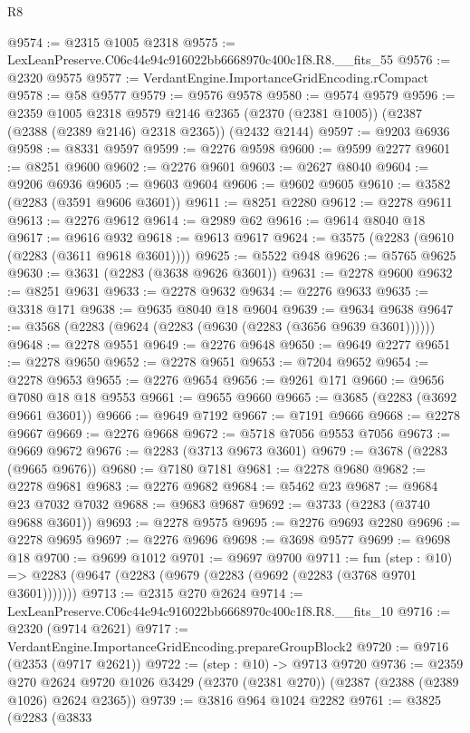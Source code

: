 \begin{lexlean}{R8}
\begin{coremodule}
@9574 := @2315 @1005 @2318
@9575 := LexLeanPreserve.C06c44e94c916022bb6668970c400c1f8.R8.__fits_55
@9576 := @2320 @9575
@9577 := VerdantEngine.ImportanceGridEncoding.rCompact
@9578 := @58 @9577
@9579 := @9576 @9578
@9580 := @9574 @9579
@9596 := @2359
    @1005
    @2318
    @9579
    @2146
    @2365
    (@2370 (@2381 @1005))
    (@2387 (@2388 (@2389 @2146) @2318 @2365))
    (@2432 @2144)
@9597 := @9203 @6936
@9598 := @8331 @9597
@9599 := @2276 @9598
@9600 := @9599 @2277
@9601 := @8251 @9600
@9602 := @2276 @9601
@9603 := @2627 @8040
@9604 := @9206 @6936
@9605 := @9603 @9604
@9606 := @9602 @9605
@9610 := @3582 (@2283 (@3591 @9606 @3601))
@9611 := @8251 @2280
@9612 := @2278 @9611
@9613 := @2276 @9612
@9614 := @2989 @62
@9616 := @9614 @8040 @18
@9617 := @9616 @932
@9618 := @9613 @9617
@9624 := @3575 (@2283 (@9610 (@2283 (@3611 @9618 @3601))))
@9625 := @5522 @948
@9626 := @5765 @9625
@9630 := @3631 (@2283 (@3638 @9626 @3601))
@9631 := @2278 @9600
@9632 := @8251 @9631
@9633 := @2278 @9632
@9634 := @2276 @9633
@9635 := @3318 @171
@9638 := @9635 @8040 @18 @9604
@9639 := @9634 @9638
@9647 := @3568 (@2283 (@9624 (@2283 (@9630 (@2283 (@3656 @9639 @3601))))))
@9648 := @2278 @9551
@9649 := @2276 @9648
@9650 := @9649 @2277
@9651 := @2278 @9650
@9652 := @2278 @9651
@9653 := @7204 @9652
@9654 := @2278 @9653
@9655 := @2276 @9654
@9656 := @9261 @171
@9660 := @9656 @7080 @18 @18 @9553
@9661 := @9655 @9660
@9665 := @3685 (@2283 (@3692 @9661 @3601))
@9666 := @9649 @7192
@9667 := @7191 @9666
@9668 := @2278 @9667
@9669 := @2276 @9668
@9672 := @5718 @7056 @9553 @7056
@9673 := @9669 @9672
@9676 := @2283 (@3713 @9673 @3601)
@9679 := @3678 (@2283 (@9665 @9676))
@9680 := @7180 @7181
@9681 := @2278 @9680
@9682 := @2278 @9681
@9683 := @2276 @9682
@9684 := @5462 @23
@9687 := @9684 @23 @7032 @7032
@9688 := @9683 @9687
@9692 := @3733 (@2283 (@3740 @9688 @3601))
@9693 := @2278 @9575
@9695 := @2276 @9693 @2280
@9696 := @2278 @9695
@9697 := @2276 @9696
@9698 := @3698 @9577
@9699 := @9698 @18
@9700 := @9699 @1012
@9701 := @9697 @9700
@9711 := fun (step : @10) =>
  @2283 (@9647 (@2283 (@9679 (@2283 (@9692 (@2283 (@3768 @9701 @3601)))))))
@9713 := @2315 @270 @2624
@9714 := LexLeanPreserve.C06c44e94c916022bb6668970c400c1f8.R8.__fits_10
@9716 := @2320 (@9714 @2621)
@9717 := VerdantEngine.ImportanceGridEncoding.prepareGroupBlock2
@9720 := @9716 (@2353 (@9717 @2621))
@9722 := (step : @10) -> @9713 @9720
@9736 := @2359
    @270
    @2624
    @9720
    @1026
    @3429
    (@2370 (@2381 @270))
    (@2387 (@2388 (@2389 @1026) @2624 @2365))
@9739 := @3816 @964 @1024 @2282
@9761 := @3825
    (@2283
      (@3833

\end{coremodule}
\end{lexlean}
